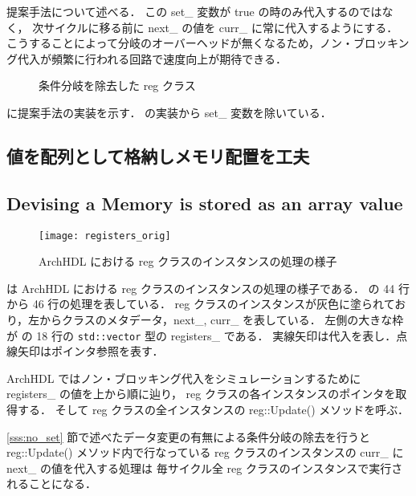 提案手法について述べる．
この set\_ 変数が true の時のみ代入するのではなく，
次サイクルに移る前に next\_ の値を curr\_ に常に代入するようにする．
こうすることによって分岐のオーバーヘッドが無くなるため，ノン・ブロッキング代入が頻繁に行われる回路で速度向上が期待できる．


\begin{figure}[tb]
 
 \caption{条件分岐を除去した reg クラス}
 \label{src:reg_no_set}
\end{figure}

 に提案手法の実装を示す．
 の実装から set\_ 変数を除いている．



\subsection{値を配列として格納しメモリ配置を工夫} \label{sss:mem_copy}
\fi
\subsection{Devising a Memory is stored as an array value}

\begin{figure}[t]
 \centering
 \texttt{[image: registers\_orig]}
 \caption{ArchHDL における reg クラスのインスタンスの処理の様子}
 \label{fig:regs}
\end{figure}

 は ArchHDL における reg クラスのインスタンスの処理の様子である．
 の 44 行から 46 行の処理を表している．
reg クラスのインスタンスが灰色に塗られており，左からクラスのメタデータ，next\_, curr\_ を表している．
左側の大きな枠が の 18 行の \verb`std::vector` 型の registers\_ である．
実線矢印は代入を表し．点線矢印はポインタ参照を表す．

ArchHDL ではノン・ブロッキング代入をシミュレーションするために registers\_ の値を上から順に辿り，
reg クラスの各インスタンスのポインタを取得する．
そして reg クラスの全インスタンスの reg::Update() メソッドを呼ぶ．

\ref{sss:no_set} 節で述べたデータ変更の有無による条件分岐の除去を行うと reg::Update() メソッド内で行なっている
reg クラスのインスタンスの curr\_ に next\_ の値を代入する処理は
毎サイクル全 reg クラスのインスタンスで実行されることになる．

